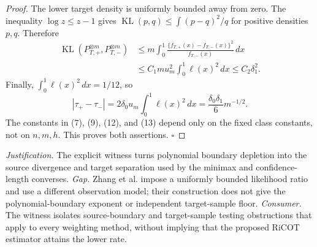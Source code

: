 \documentclass{article}
\begin{document}
\begin{proof}
The lower target density is uniformly bounded away from zero. The inequality \(\log z\le z-1\) gives \(\operatorname{KL}(p,q)\le\int(p-q)^2/q\) for positive densities \(p,q\). Therefore
\[
\begin{aligned}
\operatorname{KL}(P_{T,+}^{\otimes m},P_{T,-}^{\otimes m})
&\le m\int_0^1
\frac{\{f_{T,+}(x)-f_{T,-}(x)\}^2}{f_{T,-}(x)}\,dx\\
&\le C_1m u_m^2\int_0^1\ell(x)^2\,dx
\le C_2\delta_1^2.
\end{aligned}
\tag{12}
\]
Finally, \(\int_0^1\ell(x)^2\,dx=1/12\), so
\[
|\tau_+-\tau_-|
=2\delta_0u_m\int_0^1\ell(x)^2\,dx
=\frac{\delta_0\delta_1}{6}m^{-1/2}.
\tag{13}
\]
The constants in (7), (9), (12), and (13) depend only on the fixed class constants, not on \(n,m,h\). This proves both assertions. \(\square\)
\end{proof}
\par\smallskip\noindent \textit{Justification.} The explicit witness turns polynomial boundary depletion into the source divergence and target separation used by the minimax and confidence-length converses. \textit{Gap.} Zhang et al. impose a uniformly bounded likelihood ratio and use a different observation model; their construction does not give the polynomial-boundary exponent or independent target-sample floor. \textit{Consumer.} The witness isolates source-boundary and target-sample testing obstructions that apply to every weighting method, without implying that the proposed RiCOT estimator attains the lower rate.
\end{document}
